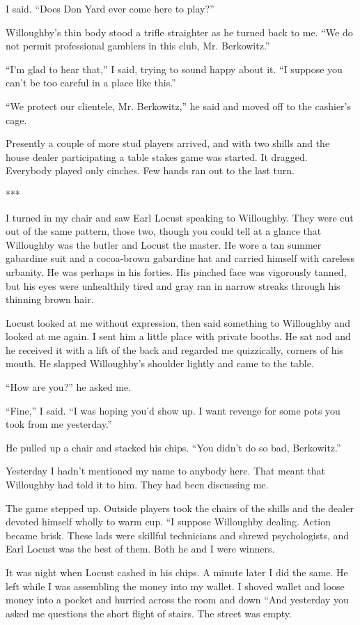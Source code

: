 \documentclass{novel}
\begin{document}
{I said. “Does Don Yard ever come here to play?”

Willoughby’s thin body stood a trifle straighter as he turned back to me. “We do not permit professional gamblers in this club, Mr. Berkowitz.”

“I’m glad to hear that,” I said, trying to sound happy about it. “I suppose you can’t be too careful in a place like this.”

“We protect our clientele, Mr. Berkowitz,” he said and moved off to the cashier’s cage.

Presently a couple of more stud players arrived, and with two shills and the house dealer participating a table stakes game was started. It dragged. Everybody played only cinches. Few hands ran out to the last turn.

***

I turned in my chair and saw Earl Locust speaking to Willoughby. They were cut out of the same pattern, those two, though you could tell at a glance that Willoughby was the butler and Locust the master. He wore a tan summer gabardine suit and a cocoa-brown gabardine hat and carried himself with careless urbanity. He was perhaps in his forties. His pinched face was vigorously tanned, but his eyes were unhealthily tired and gray ran in narrow streaks through his thinning brown hair.

Locust looked at me without expression, then said something to Willoughby and looked at me again. I sent him a little place with private booths. He sat nod and he received it with a lift of the back and regarded me quizzically, corners of his mouth. He slapped Willoughby’s shoulder lightly and came to the table.

“How are you?” he asked me.

“Fine,” I said. “I was hoping you’d show up. I want revenge for some pots you took from me yesterday.”

He pulled up a chair and stacked his chips. “You didn’t do so bad, Berkowitz.”

Yesterday I hadn’t mentioned my name to anybody here. That meant that Willoughby had told it to him. They had been discussing me.

The game stepped up. Outside players took the chairs of the shills and the dealer devoted himself wholly to warm cup. “I suppose Willoughby dealing. Action became brisk. These lads were skillful technicians and shrewd psychologists, and Earl Locust was the best of them. Both he and I were winners.

It was night when Locust cashed in his chips. A minute later I did the same. He left while I was assembling the money into my wallet. I shoved wallet and loose money into a pocket and hurried across the room and down “And yesterday you asked me questions the short flight of stairs. The street was empty.

}
\end{document}
